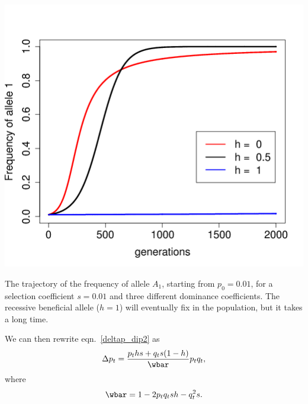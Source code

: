 \begin{marginfigure}
\begin{center}
\includegraphics[width=1.2 \textwidth]{figures/simple_diploid_trajs.png}
\end{center}
\caption{The trajectory of the frequency of allele $A_1$, starting
  from $p_{0}=0.01$, for a selection coefficient $s=0.01$ and three
  different dominance coefficients. The recessive beneficial allele ($h=1$) will
  eventually fix in the population, but it takes a long
  time. }
  \label{fig:diploid_traj}
\end{marginfigure}





We can then rewrite eqn.\ \eqref{deltap_dip2} as
\begin{equation}
\Delta p_t = \frac{p_ths + q_t s(1-h)}{\wbar}p_tq_t ,
\label{deltap_direct}
\end{equation}
where
\begin{equation}
\wbar = 1-2p_tq_t sh-q_t^2s.
\end{equation}\\

